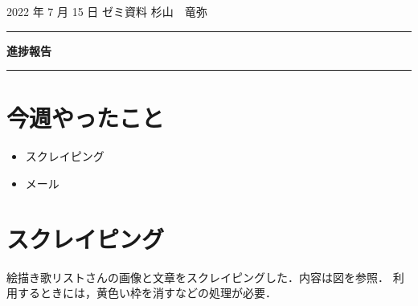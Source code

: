 \documentclass[onecolumn]{ujarticle}   %
\begin{document}

		\noindent
		\hspace{1em}
		2022 年 7 月 15 日
		ゼミ資料
		\hfill
		杉山　竜弥
		\vspace{2mm}

		\hrule
		\begin{center}
			{\Large \bf 進捗報告}
		\end{center}
		\hrule
		\vspace{9mm}


\section{今週やったこと}
\begin{itemize}
  \item スクレイピング
  \item メール
\end{itemize}


\section{スクレイピング}
絵描き歌リストさんの画像と文章をスクレイピングした．内容は図を参照．
利用するときには，黄色い枠を消すなどの処理が必要．
\end{document}
